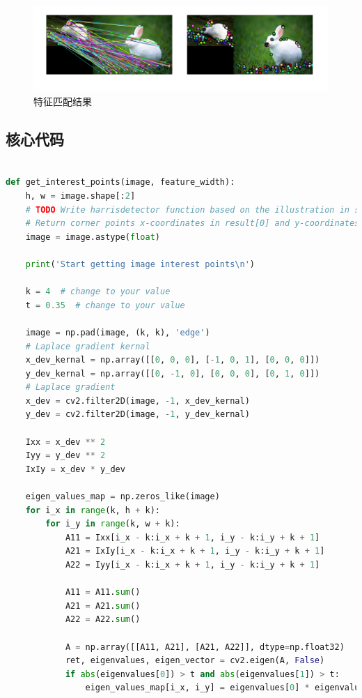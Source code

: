 \documentclass{article}
\begin{document}
\begin{figure}[h]
    \centering
    \includegraphics[width=\textwidth]{./project2/feature-match.png}
    \caption{特征匹配结果}
\end{figure}

\subsection{核心代码}
\begin{lstlisting}[language=Python]

def get_interest_points(image, feature_width):
    h, w = image.shape[:2]
    # TODO Write harrisdetector function based on the illustration in specification.
    # Return corner points x-coordinates in result[0] and y-coordinates in result[1]
    image = image.astype(float)

    print('Start getting image interest points\n')

    k = 4  # change to your value
    t = 0.35  # change to your value

    image = np.pad(image, (k, k), 'edge')
    # Laplace gradient kernal
    x_dev_kernal = np.array([[0, 0, 0], [-1, 0, 1], [0, 0, 0]])
    y_dev_kernal = np.array([[0, -1, 0], [0, 0, 0], [0, 1, 0]])
    # Laplace gradient
    x_dev = cv2.filter2D(image, -1, x_dev_kernal)
    y_dev = cv2.filter2D(image, -1, y_dev_kernal)

    Ixx = x_dev ** 2
    Iyy = y_dev ** 2
    IxIy = x_dev * y_dev

    eigen_values_map = np.zeros_like(image)
    for i_x in range(k, h + k):
        for i_y in range(k, w + k):
            A11 = Ixx[i_x - k:i_x + k + 1, i_y - k:i_y + k + 1]
            A21 = IxIy[i_x - k:i_x + k + 1, i_y - k:i_y + k + 1]
            A22 = Iyy[i_x - k:i_x + k + 1, i_y - k:i_y + k + 1]

            A11 = A11.sum()
            A21 = A21.sum()
            A22 = A22.sum()

            A = np.array([[A11, A21], [A21, A22]], dtype=np.float32)
            ret, eigenvalues, eigen_vector = cv2.eigen(A, False)
            if abs(eigenvalues[0]) > t and abs(eigenvalues[1]) > t:
                eigen_values_map[i_x, i_y] = eigenvalues[0] * eigenvalues[1]


\end{lstlisting}
\end{document}
